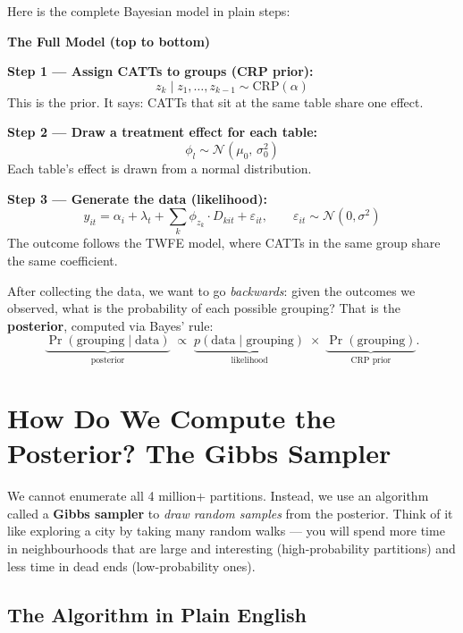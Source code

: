 \documentclass[12pt]{article}
\begin{document}
Here is the complete Bayesian model in plain steps:

\begin{conceptbox}
\textbf{The Full Model (top to bottom)}

\medskip
\textbf{Step 1 --- Assign CATTs to groups (CRP prior):}
\[
  z_k \mid z_1,\ldots,z_{k-1} \sim \text{CRP}(\alpha)
\]
This is the prior. It says: CATTs that sit at the same table share one effect.

\medskip
\textbf{Step 2 --- Draw a treatment effect for each table:}
\[
  \phi_l \sim \mathcal{N}(\mu_0,\, \sigma_0^2)
\]
Each table's effect is drawn from a normal distribution.

\medskip
\textbf{Step 3 --- Generate the data (likelihood):}
\[
  y_{it} = \alpha_i + \lambda_t + \sum_k \phi_{z_k} \cdot D_{kit} + \varepsilon_{it},
  \qquad \varepsilon_{it} \sim \mathcal{N}(0, \sigma^2)
\]
The outcome follows the TWFE model, where CATTs in the same group
share the same coefficient.
\end{conceptbox}

After collecting the data, we want to go \textit{backwards}: given the
outcomes we observed, what is the probability of each possible grouping?
That is the \textbf{posterior}, computed via Bayes' rule:
\begin{equation}
  \underbrace{\Pr(\text{grouping} \mid \text{data})}_{\text{posterior}}
  \;\propto\;
  \underbrace{p(\text{data} \mid \text{grouping})}_{\text{likelihood}}
  \;\times\;
  \underbrace{\Pr(\text{grouping})}_{\text{CRP prior}}.
\end{equation}

\section{How Do We Compute the Posterior? The Gibbs Sampler}

We cannot enumerate all 4 million+ partitions. Instead, we use an algorithm
called a \textbf{Gibbs sampler} to \textit{draw random samples} from the
posterior. Think of it like exploring a city by taking many random walks ---
you will spend more time in neighbourhoods that are large and interesting
(high-probability partitions) and less time in dead ends (low-probability ones).

\subsection{The Algorithm in Plain English}
\end{document}
